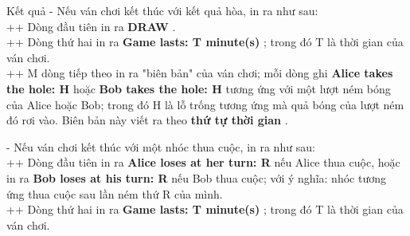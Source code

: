 Kết quả
- Nếu ván chơi kết thúc với kết quả hòa, in ra như sau:   
\\   ++ Dòng đầu tiên in ra   \textbf{    DRAW   }   .   
\\   ++ Dòng thứ hai in ra   \textbf{    Game lasts: T minute(s)   }   ; trong đó T là thời gian của ván chơi.   
\\   ++ M dòng tiếp theo in ra "biên bản" của ván chơi; mỗi dòng ghi   \textbf{    Alice takes the hole: H   }   hoặc   \textbf{    Bob takes the hole: H   }   tương ứng với một lượt ném bóng của Alice hoặc Bob; trong đó H là lỗ trống tương ứng mà quả bóng của lượt ném đó rơi vào. Biên bản này viết ra theo   \textbf{    thứ tự thời gian   }   .  

   - Nếu ván chơi kết thúc với một nhóc thua cuộc, in ra như sau:   
\\   ++ Dòng đầu tiên in ra   \textbf{    Alice loses at her turn: R   }   nếu Alice thua cuộc, hoặc in ra   \textbf{    Bob loses at his turn: R   }   nếu Bob thua cuộc; với ý nghĩa: nhóc tương ứng thua cuộc sau lần ném thứ R của mình.   
\\   ++ Dòng thứ hai in ra   \textbf{    Game lasts: T minute(s)   }   ; trong đó T là thời gian của ván chơi.